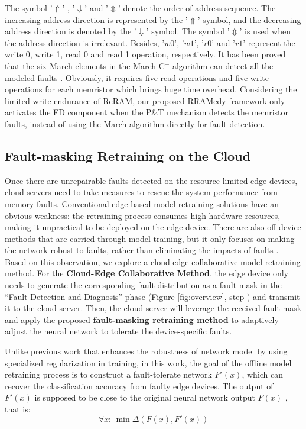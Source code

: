 The symbol  '$\Uparrow$' , '$\Downarrow$' and '$\Updownarrow$' denote the order of address sequence. The increasing address direction is represented by the '$\Uparrow$' symbol, and the decreasing address direction is denoted by the  '$\Downarrow$' symbol. The symbol '$\Updownarrow$' is used when the address direction is irrelevant. Besides, '$w0$', '$w1$', '$r0$' and '$r1$' represent the write 0, write 1, read 0 and read 1 operation, respectively. It has been proved that the six March elements in the March C${^-}$ algorithm can detect all the modeled faults \cite{7551274}. Obviously, it requires five read operations and five write operations for each memristor which brings huge time overhead. Considering the limited write endurance of ReRAM, our proposed RRAMedy framework only activates the FD component  when the P\&T mechanism detects the memristor faults, instead of using the March algorithm directly for fault detection. 


\subsection{Fault-masking Retraining on the Cloud}
Once there are unrepairable faults detected on the resource-limited edge devices, cloud servers need to take measures to rescue the system performance from memory faults. Conventional edge-based model retraining solutions have an obvious weakness: the retraining process consumes high hardware resources, making it unpractical to be deployed on the edge device. There are also off-device methods that are carried through model training, but it only focuses on making the network robust to faults, rather than eliminating the impacts of faults \cite{7926952}.  Based on this observation, we explore a cloud-edge collaborative model retraining method. For the {\bf Cloud-Edge Collaborative Method}, the edge device only needs to generate the corresponding fault distribution as a fault-mask in the  ``Fault Detection and Diagnosis'' phase (Figure \ref{fig:overview}, step ) and transmit it to the cloud server.  Then, the cloud server will leverage the received fault-mask and apply the proposed {\bf fault-masking retraining method} to adaptively adjust the neural network to tolerate the device-specific faults.
                                        
Unlike previous work that enhances the robustness of network model by using specialized regularization in training, in this work, the goal of the offline model retraining process is to construct a fault-tolerate network $F'(x)$, which can recover the classification accuracy from faulty edge devices. The output of $F'(x)$ is supposed to be close to the original neural network output $F(x)$ , that is:
\begin{equation}
    \forall x:\,\min \Delta (F(x),F'(x))
\end{equation}
                                                                
